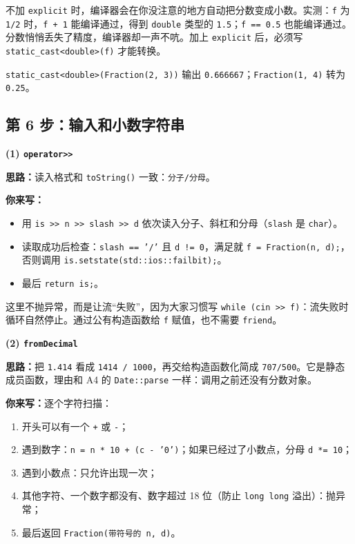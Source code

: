 \documentclass[11pt,a4paper]{article}
\newcommand{\code}[1]{\texttt{#1}}
\newcommand{\idea}{\textbf{思路：}}
\newcommand{\todo}{\textbf{你来写：}}
\begin{document}
\begin{tip}
不加 \code{explicit} 时，编译器会在你没注意的地方自动把分数变成小数。实测：\code{f} 为 \code{1/2} 时，\code{f + 1} 能编译通过，得到 \code{double} 类型的 \code{1.5}；\code{f == 0.5} 也能编译通过。分数悄悄丢失了精度，编译器却一声不吭。加上 \code{explicit} 后，必须写 \code{static\_cast<double>(f)} 才能转换。
\end{tip}

\begin{done}
\code{static\_cast<double>(Fraction(2, 3))} 输出 \code{0.666667}；\code{Fraction(1, 4)} 转为 \code{0.25}。
\end{done}

\subsection{第 6 步：输入和小数字符串}

\textbf{(1) \texttt{operator>>}}

\idea 读入格式和 \code{toString()} 一致：\code{分子/分母}。

\todo
\begin{itemize}
  \item 用 \code{is >> n >> slash >> d} 依次读入分子、斜杠和分母（\code{slash} 是 \code{char}）。
  \item 读取成功后检查：\code{slash == '/'} 且 \code{d != 0}，满足就 \code{f = Fraction(n, d);}，否则调用 \code{is.setstate(std::ios::failbit);}。
  \item 最后 \code{return is;}。
\end{itemize}

这里不抛异常，而是让流“失败”，因为大家习惯写 \code{while (cin >> f)}：流失败时循环自然停止。通过公有构造函数给 \code{f} 赋值，也不需要 \code{friend}。

\textbf{(2) \texttt{fromDecimal}}

\idea 把 \code{1.414} 看成 \code{1414 / 1000}，再交给构造函数化简成 \code{707/500}。它是静态成员函数，理由和 A4 的 \code{Date::parse} 一样：调用之前还没有分数对象。

\todo 逐个字符扫描：
\begin{enumerate}
  \item 开头可以有一个 \code{+} 或 \code{-}；
  \item 遇到数字：\code{n = n * 10 + (c - '0')}；如果已经过了小数点，分母 \code{d *= 10}；
  \item 遇到小数点：只允许出现一次；
  \item 其他字符、一个数字都没有、数字超过 18 位（防止 \code{long long} 溢出）：抛异常；
  \item 最后返回 \code{Fraction(带符号的 n, d)}。
\end{enumerate}
\end{document}
